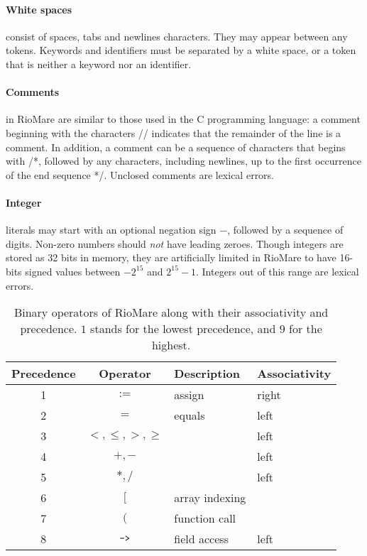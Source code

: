 \documentclass{article}
\begin{document}
\paragraph{White spaces} consist of spaces, tabs and newlines
characters. They may appear between any tokens.
Keywords and identifiers must be separated by a white space,
or a token that is neither a keyword nor an identifier.
\paragraph{Comments} in RioMare are similar to those used in the C programming language:
a comment beginning with the characters // indicates that the remainder of the line is a comment.
In addition, a comment can be a sequence of characters that begins with /*,
followed by any characters, including newlines, up to the first occurrence of the end sequence */. Unclosed comments are lexical errors.
\paragraph{Integer} literals may start with an optional negation sign $-$,
followed by a sequence of digits.
Non-zero numbers should \textit{not} have leading zeroes.
Though integers are stored as 32 bits in memory,
they are artificially limited in RioMare to have
16-bits signed values between $-2^{15}$ and $2^{15}-1$.
Integers out of this range are lexical errors.

\begin{table}[h]
\centering
\begin{tabular}{|c|c|l|l| }
  \hline
  Precedence       & Operator & Description & Associativity \\
  \hline
  \hline
  1                & $:=$            & assign         & right \\
  \hline
  2                & $=$             & equals         & left  \\
  \hline
  3                & $<,\leq,>,\geq$ &                & left  \\
  \hline
  4                & $+,-$           &                & left  \\
  \hline
  5                & $*,/$           &                & left  \\
  \hline
  6                & $[$             & array indexing &       \\
  \hline
  7                & $($             & function call  &       \\
  \hline
  8                & $\verb"->"$     & field access   & left  \\
  \hline
\end{tabular}
\caption{
Binary operators of RioMare along with their associativity and precedence.
$1$ stands for the lowest precedence, and $9$ for the highest.
\label{Table_Binary_Operators_Of_RioMare}}
\end{table}
\end{document}
